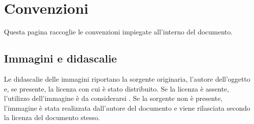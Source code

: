 \chapter*{Convenzioni}
Questa pagina raccoglie le convenzioni impiegate all'interno del documento.
\section*{Immagini e didascalie}
Le didascalie delle immagini riportano la sorgente originaria, l'autore dell'oggetto e, se presente, la licenza con cui è stato distribuito.
Se la licenza è assente, l'utilizzo dell'immagine è da considerarsi . 
Se la sorgente non è presente, l'immagine è stata realizzata dall'autore del documento e viene rilasciata secondo la licenza del documento stesso.
